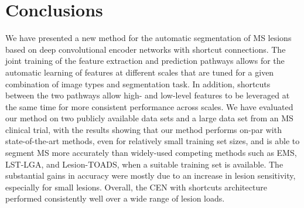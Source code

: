 \section{Conclusions}


We have presented a new method for the automatic segmentation of MS lesions
based on deep convolutional encoder networks with shortcut connections.
The joint training of the feature extraction and prediction pathways allows for
the automatic learning of features at different scales that are tuned for a
given combination of image types and segmentation task. In addition, shortcuts
between the two pathways allow high- and low-level features to be leveraged at
the same time for more consistent performance across scales. We have evaluated
our method on two publicly available data sets and a large data set from an MS
clinical trial, with the results showing that our method performs on-par with
state-of-the-art methods, even for relatively small training set sizes, and is
able to segment MS more accurately than widely-used competing methods such as
EMS, LST-LGA, and Lesion-TOADS, when a suitable training set is available.
The substantial gains in accuracy were mostly due to an increase in lesion
sensitivity, especially for small lesions. Overall, the CEN with shortcuts
architecture performed consistently well over a wide range of lesion loads.

